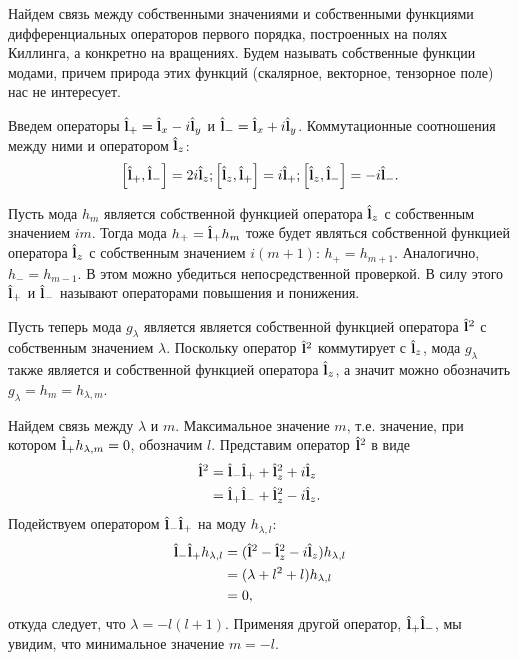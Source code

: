 \documentclass[12pt,a4paper]{article}
\begin{document}
        Найдем связь между собственными значениями и собственными функциями дифференциальных операторов первого порядка, построенных на полях Киллинга, а конкретно на вращениях. Будем называть собственные функции модами, причем природа этих функций (скалярное, векторное, тензорное поле) нас не интересует.

        Введем операторы $\hat{\mathbf{l}}_{+} = \hat{\mathbf{l}}_x - i\hat{\mathbf{l}}_y$ и $\hat{\mathbf{l}}_{-} = \hat{\mathbf{l}}_x + i\hat{\mathbf{l}}_y$. Коммутационные соотношения между ними и оператором $\hat{\mathbf{l}}_z$:
        \begin{equation}
            \left[ \hat{\mathbf{l}}_{+}, \hat{\mathbf{l}}_{-} \right] = 2 i \hat{\mathbf{l}}_{z} ;
            \left[ \hat{\mathbf{l}}_{z}, \hat{\mathbf{l}}_{+} \right] =   i \hat{\mathbf{l}}_{+} ;
            \left[ \hat{\mathbf{l}}_{z}, \hat{\mathbf{l}}_{-} \right] = - i \hat{\mathbf{l}}_{-} .
        \end{equation}

        Пусть мода $h_m$ является собственной функцией оператора $\hat{\mathbf{l}}_z$ с собственным значением $i m$. Тогда мода $h_{+} = \hat{\mathbf{l}}_{+} h_m$ тоже будет являться собственной функцией оператора $\hat{\mathbf{l}}_z$ с собственным значением $i (m + 1)$: $h_{+} = h_{m + 1}$. Аналогично, $h_{-} = h_{m - 1}$. В этом можно убедиться непосредственной проверкой. В силу этого $\hat{\mathbf{l}}_{+}$ и $\hat{\mathbf{l}}_{-}$ называют операторами повышения и понижения.

        Пусть теперь мода $g_\lambda$ является является собственной функцией оператора $\hat{\mathbf{l}}^2$ с собственным значением $\lambda$. Поскольку оператор $\hat{\mathbf{l}}^2$ коммутирует с $\hat{\mathbf{l}}_z$, мода $g_\lambda$ также является и собственной функцией оператора $\hat{\mathbf{l}}_z$, а значит можно обозначить $g_\lambda = h_m = h_{\lambda,m}$.

        Найдем связь между $\lambda$ и $m$. Максимальное значение $m$, т.е. значение, при котором $\hat{\mathbf{l}}_{+} h_{\lambda,m} = 0$, обозначим $l$. Представим оператор $\hat{\mathbf{l}}^2$ в виде
        \begin{equation}\begin{aligned}
            \hat{\mathbf{l}}^2
                &= \hat{\mathbf{l}}_{-}\hat{\mathbf{l}}_{+} + \hat{\mathbf{l}}^2_{z} + i \hat{\mathbf{l}}_{z} \\
                &= \hat{\mathbf{l}}_{+}\hat{\mathbf{l}}_{-} + \hat{\mathbf{l}}^2_{z} - i \hat{\mathbf{l}}_{z} .
        \end{aligned}\end{equation}
        Подействуем оператором $\hat{\mathbf{l}}_{-}\hat{\mathbf{l}}_{+}$ на моду $h_{\lambda,l}$:
        \begin{equation}\begin{aligned}
            \hat{\mathbf{l}}_{-}\hat{\mathbf{l}}_{+} h_{\lambda,l}
                &= (\hat{\mathbf{l}}^2 - \hat{\mathbf{l}}^2_{z} - i \hat{\mathbf{l}}_{z}) h_{\lambda,l} \\
                &= (\lambda + l^2 + l) h_{\lambda,l} \\
                &= 0 ,
        \end{aligned}\end{equation}
        откуда следует, что $\lambda = - l (l + 1)$. Применяя другой оператор, $\hat{\mathbf{l}}_{+}\hat{\mathbf{l}}_{-}$, мы увидим, что минимальное значение $m = - l$.
\end{document}
